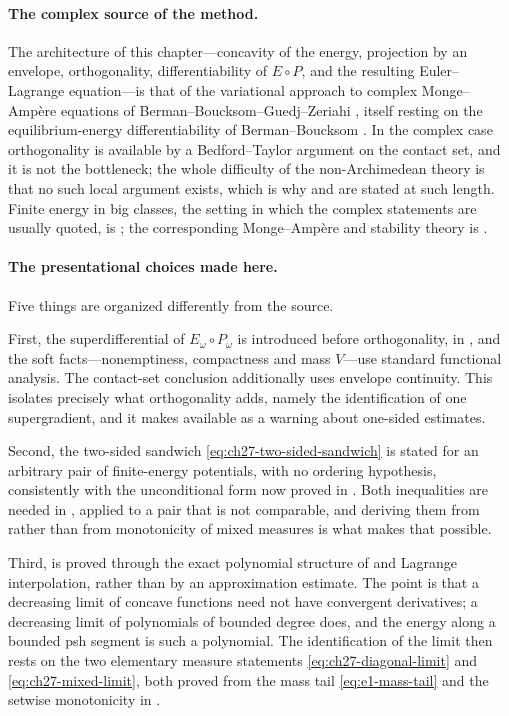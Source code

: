 \paragraph{The complex source of the method.}
The architecture of this chapter---concavity of the energy, projection by an
envelope, orthogonality, differentiability of $E\circ P$, and the
resulting Euler--Lagrange equation---is that of the variational approach to
complex Monge--Amp\`ere equations of Berman--Boucksom--Guedj--Zeriahi
\cite{BBGZ13}, itself resting on the equilibrium-energy differentiability of
Berman--Boucksom \cite{BB10}.  In the complex case orthogonality is
available by a Bedford--Taylor argument on the contact set, and it is not
the bottleneck; the whole difficulty of the non-Archimedean theory is that
no such local argument exists, which is why
 and
 are stated at such length.  Finite
energy in big classes, the setting in which the complex statements are
usually quoted, is \cite{BEGZ10}; the corresponding Monge--Amp\`ere and
stability theory is \cite{BBEGZ16}.

\paragraph{The presentational choices made here.}
Five things are organized differently from the source.

First, the superdifferential of $E_\omega\circ P_\omega$ is introduced
before orthogonality, in , and the soft
facts---nonemptiness, compactness and mass $V$---use standard functional
analysis.  The contact-set conclusion additionally uses envelope continuity.  This isolates precisely what
orthogonality adds, namely the identification of one supergradient, and it
makes  available as a warning
about one-sided estimates.

Second, the two-sided sandwich \eqref{eq:ch27-two-sided-sandwich} is stated
for an arbitrary pair of finite-energy potentials, with no ordering
hypothesis, consistently with the unconditional form now proved in
.  Both inequalities are needed in
, applied to a pair that is
not comparable, and deriving them from
 rather than from monotonicity of mixed
measures is what makes that possible.

Third,  is proved through the exact
polynomial structure of  and Lagrange
interpolation, rather than by an approximation estimate.  The point is that
a decreasing limit of concave functions need not have convergent
derivatives; a decreasing limit of polynomials of bounded degree does, and
the energy along a bounded psh segment is such a polynomial.  The
identification of the limit then rests on the two elementary measure
statements \eqref{eq:ch27-diagonal-limit} and
\eqref{eq:ch27-mixed-limit}, both proved from the mass tail
\eqref{eq:e1-mass-tail} and the setwise monotonicity in
.

